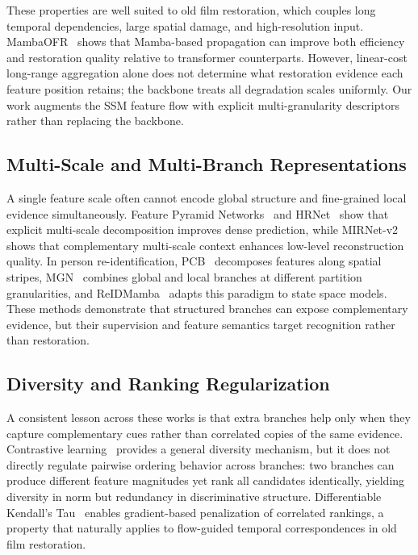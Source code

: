 These properties are well suited to old film restoration, which couples long temporal dependencies, large spatial damage, and high-resolution input. MambaOFR~\cite{mao2025mambaofr} shows that Mamba-based propagation can improve both efficiency and restoration quality relative to transformer counterparts. However, linear-cost long-range aggregation alone does not determine what restoration evidence each feature position retains; the backbone treats all degradation scales uniformly. Our work augments the SSM feature flow with explicit multi-granularity descriptors rather than replacing the backbone.

\subsection{Multi-Scale and Multi-Branch Representations}
\label{subsec:multigran}

A single feature scale often cannot encode global structure and fine-grained local evidence simultaneously. Feature Pyramid Networks~\cite{lin2017fpn} and HRNet~\cite{wang2021hrnet} show that explicit multi-scale decomposition improves dense prediction, while MIRNet-v2~\cite{zamir2022mirnetv2} shows that complementary multi-scale context enhances low-level reconstruction quality. In person re-identification, PCB~\cite{sun2018pcb} decomposes features along spatial stripes, MGN~\cite{wang2018mgn} combines global and local branches at different partition granularities, and ReIDMamba~\cite{gu2025reidmamba} adapts this paradigm to state space models. These methods demonstrate that structured branches can expose complementary evidence, but their supervision and feature semantics target recognition rather than restoration.

\subsection{Diversity and Ranking Regularization}
\label{subsec:diversity_ranking}

A consistent lesson across these works is that extra branches help only when they capture complementary cues rather than correlated copies of the same evidence. Contrastive learning~\cite{chen2020mocov2} provides a general diversity mechanism, but it does not directly regulate pairwise ordering behavior across branches: two branches can produce different feature magnitudes yet rank all candidates identically, yielding diversity in norm but redundancy in discriminative structure. Differentiable Kendall's Tau~\cite{zheng2023diffkendall} enables gradient-based penalization of correlated rankings, a property that naturally applies to flow-guided temporal correspondences in old film restoration.

